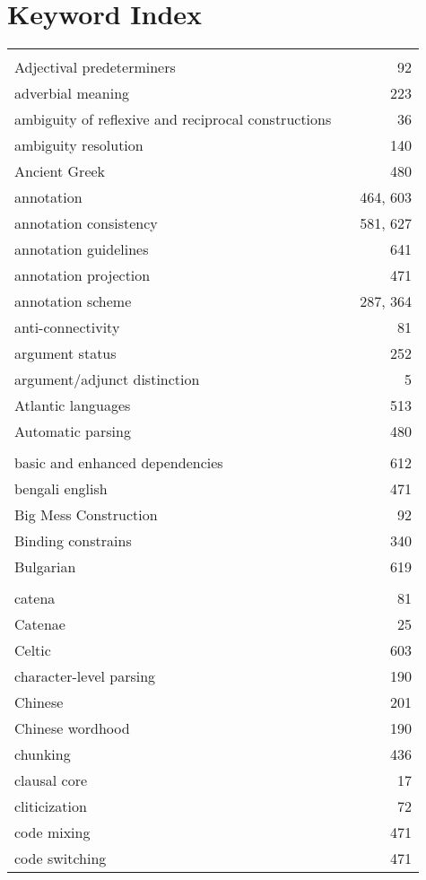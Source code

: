 \documentclass{easychair}
\begin{document}
\section*{Keyword Index}
\begin{longtable}{lp{7em}r}
\\
\\
Adjectival predeterminers & & 92 
\\
adverbial meaning & & 223 
\\
ambiguity of reflexive and reciprocal constructions & & 36 
\\
ambiguity resolution & & 140 
\\
Ancient Greek & & 480 
\\
annotation & & 464, 603 
\\
annotation consistency & & 581, 627 
\\
annotation guidelines & & 641 
\\
annotation projection & & 471 
\\
annotation scheme & & 287, 364 
\\
anti-connectivity & & 81 
\\
argument status & & 252 
\\
argument/adjunct distinction & & 5 
\\
Atlantic languages & & 513 
\\
Automatic parsing & & 480 
\\
\\
basic and enhanced dependencies & & 612 
\\
bengali english & & 471 
\\
Big Mess Construction & & 92 
\\
Binding constrains & & 340 
\\
Bulgarian & & 619 
\\
\\
catena & & 81 
\\
Catenae & & 25 
\\
Celtic & & 603 
\\
character-level parsing & & 190 
\\
Chinese & & 201 
\\
Chinese wordhood & & 190 
\\
chunking & & 436 
\\
clausal core & & 17 
\\
cliticization & & 72 
\\
code mixing & & 471 
\\
code switching & & 471 
\\

\end{longtable}
\end{document}
